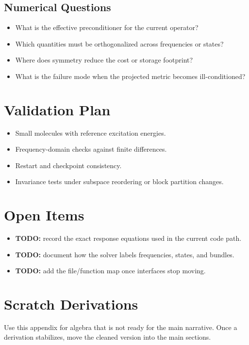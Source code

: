 \documentclass[11pt]{article}
\numberwithin{equation}{section}
\begin{document}
\subsection{Numerical Questions}

\begin{itemize}
  \item What is the effective preconditioner for the current operator?
  \item Which quantities must be orthogonalized across frequencies or states?
  \item Where does symmetry reduce the cost or storage footprint?
  \item What is the failure mode when the projected metric becomes ill-conditioned?
\end{itemize}

\section{Validation Plan}

\begin{itemize}
  \item Small molecules with reference excitation energies.
  \item Frequency-domain checks against finite differences.
  \item Restart and checkpoint consistency.
  \item Invariance tests under subspace reordering or block partition changes.
\end{itemize}

\section{Open Items}

\begin{itemize}
  \item \textbf{TODO:} record the exact response equations used in the current code path.
  \item \textbf{TODO:} document how the solver labels frequencies, states, and bundles.
  \item \textbf{TODO:} add the file/function map once interfaces stop moving.
\end{itemize}

\appendix

\section{Scratch Derivations}

Use this appendix for algebra that is not ready for the main narrative.
Once a derivation stabilizes, move the cleaned version into the main sections.
\end{document}
